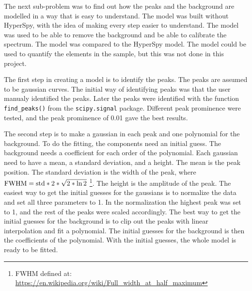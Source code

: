 The next sub-problem was to find out how the peaks and the background are modelled in a way that is easy to understand.
The model was built without HyperSpy, with the idea of making every step easier to understand.
The model was used to be able to remove the background and be able to calibrate the spectrum.
The model was compared to the HyperSpy model.
The model could be used to quantify the elements in the sample, but this was not done in this project.

The first step in creating a model is to identify the peaks.
The peaks are assumed to be gaussian curves.
The initial way of identifying peaks was that the user manualy identified the peaks.
Later the peaks were identified with the function \verb|find_peaks()| from the \verb|scipy.signal| package.
Different peak prominence were tested, and the peak prominence of 0.01 gave the best results.


The second step is to make a gaussian in each peak and one polynomial for the background.
To do the fitting, the components need an initial guess.
The background needs a coefficient for each order of the polynomial.
Each gaussian need to have a mean, a standard deviation, and a height.
The mean is the peak position.
The standard deviation is the width of the peak, where $\textnormal{FWHM} = \textnormal{std}*2*\sqrt{2*\ln{2}}$ \footnote{FWHM defined at: \url{https://en.wikipedia.org/wiki/Full_width_at_half_maximum}}.
The height is the amplitude of the peak.
The easiest way to get the initial guesses for the gaussians is to normalize the data and set all three parameters to 1.
In the normalization the highest peak was set to 1, and the rest of the peaks were scaled accordingly.
The best way to get the initial guesses for the background is to clip out the peaks with linear interpolation and fit a polynomial.
The initial guesses for the background is then the coefficients of the polynomial.
With the initial guesses, the whole model is ready to be fitted.

